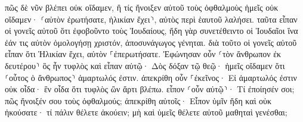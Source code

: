\documentclass{openreader}
\begin{document}
πῶς δὲ νῦν βλέπει οὐκ οἴδαμεν, ἢ τίς ἤνοιξεν αὐτοῦ τοὺς ὀφθαλμοὺς ἡμεῖς οὐκ οἴδαμεν· ⸂αὐτὸν ἐρωτήσατε, ἡλικίαν ἔχει⸃, αὐτὸς περὶ ἑαυτοῦ λαλήσει. 
ταῦτα εἶπαν οἱ γονεῖς αὐτοῦ ὅτι ἐφοβοῦντο τοὺς Ἰουδαίους, ἤδη γὰρ συνετέθειντο οἱ Ἰουδαῖοι ἵνα ἐάν τις αὐτὸν ὁμολογήσῃ χριστόν, ἀποσυνάγωγος γένηται. 
διὰ τοῦτο οἱ γονεῖς αὐτοῦ εἶπαν ὅτι Ἡλικίαν ἔχει, αὐτὸν ⸀ἐπερωτήσατε. 
Ἐφώνησαν οὖν ⸂τὸν ἄνθρωπον ἐκ δευτέρου⸃ ὃς ἦν τυφλὸς καὶ εἶπαν αὐτῷ· Δὸς δόξαν τῷ θεῷ· ἡμεῖς οἴδαμεν ὅτι ⸂οὗτος ὁ ἄνθρωπος⸃ ἁμαρτωλός ἐστιν. 
ἀπεκρίθη οὖν ⸀ἐκεῖνος· Εἰ ἁμαρτωλός ἐστιν οὐκ οἶδα· ἓν οἶδα ὅτι τυφλὸς ὢν ἄρτι βλέπω. 
εἶπον ⸂οὖν αὐτῷ⸃· Τί ἐποίησέν σοι; πῶς ἤνοιξέν σου τοὺς ὀφθαλμούς; 
ἀπεκρίθη αὐτοῖς· Εἶπον ὑμῖν ἤδη καὶ οὐκ ἠκούσατε· τί πάλιν θέλετε ἀκούειν; μὴ καὶ ὑμεῖς θέλετε αὐτοῦ μαθηταὶ γενέσθαι; 
\end{document}
